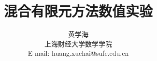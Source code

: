 \documentclass{book}
\begin{document}
\newcommand{\onech}[4]{
\makebox[92pt][l]{(A) #1} \hfill
\makebox[92pt][l]{(B) #2} \hfill
\makebox[92pt][l]{(C) #3} \hfill
\makebox[92pt][l]{(D) #4}\\}
\newcommand{\twoch}[4]{
\indent\makebox[110pt][l]{\qquad(A) #1} \hfill\makebox[220pt][l]{(B) #2}\\
\indent\makebox[110pt][l]{\qquad(C) #3} \hfill\makebox[220pt][l]{(D) #4}\\}
\newcommand{\fourch}[4]{
\indent\makebox[262pt][l]{(A) #1} \newline
\indent\makebox[262pt][l]{(B) #2} \newline
\indent\makebox[262pt][l]{(C) #3} \newline
\indent\makebox[262pt][l]{(D) #4} \newline}

\def\comp{\ensuremath\mathop{\scalebox{.6}{$\circ$}}}
\newcommand\arccot{\mathop{\mathrm{arccot}}}
\newcommand\sgn{\mathop{\mathrm{sgn}}}
\newenvironment{xenumerate}[1][]
{\enumerate[(1)]}{\endenumerate}



\newcommand\BackgroundPicture{%
\put(0,0){%
    \parbox[b][\paperheight]{\paperwidth}{%
      \vfill
      \centering%
\begin{tikzpicture}[remember picture,overlay]
\node [rotate=60,scale=4,text opacity=0.1] at (-2,+2) {黄学海};
\node [rotate=60,scale=4,text opacity=0.1] at (current page.center) {上海财经大学数学学院};
\end{tikzpicture}%
      \vfill
    }}}




\title{混合有限元方法数值实验}
\author{黄学海  \\{\small 上海财经大学数学学院}
\\{\small E-mail: huang.xuehai@sufe.edu.cn}
\\
\\
\\
\\
 }
\end{document}
